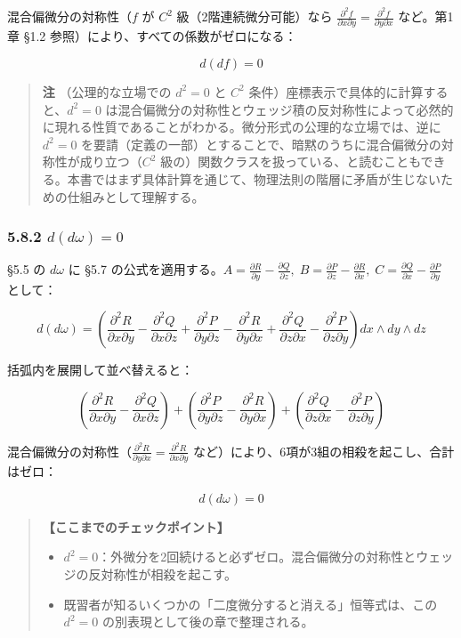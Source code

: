 \documentclass[a4paper,12pt,openany]{book}
\begin{document}
混合偏微分の対称性（\(f\) が \(C^2\) 級（2階連続微分可能）なら
\(\frac{\partial^2 f}{\partial x \partial y} = \frac{\partial^2 f}{\partial y \partial x}\)
など。第1章 §1.2 参照）により、すべての係数がゼロになる：

\[d(df) = 0\]

\begin{quote}
\textbf{注} （公理的な立場での \(d^2=0\) と \(C^2\)
条件）座標表示で具体的に計算すると、\(d^2=0\)
は混合偏微分の対称性とウェッジ積の反対称性によって必然的に現れる性質であることがわかる。微分形式の公理的な立場では、逆に
\(d^2=0\)
を要請（定義の一部）とすることで、暗黙のうちに混合偏微分の対称性が成り立つ（\(C^2\)
級の）関数クラスを扱っている、と読むこともできる。本書ではまず具体計算を通じて、物理法則の階層に矛盾が生じないための仕組みとして理解する。
\end{quote}

\hypertarget{ddomega-0}{%
\subsubsection{\texorpdfstring{5.8.2
\(d(d\omega) = 0\)}{5.8.2 d(d\textbackslash omega) = 0}}\label{ddomega-0}}

§5.5 の \(d\omega\) に §5.7
の公式を適用する。\(A = \frac{\partial R}{\partial y} - \frac{\partial Q}{\partial z},\; B = \frac{\partial P}{\partial z} - \frac{\partial R}{\partial x},\; C = \frac{\partial Q}{\partial x} - \frac{\partial P}{\partial y}\)
として：

\[d(d\omega) = \left(\frac{\partial^2 R}{\partial x \partial y} - \frac{\partial^2 Q}{\partial x \partial z} + \frac{\partial^2 P}{\partial y \partial z} - \frac{\partial^2 R}{\partial y \partial x} + \frac{\partial^2 Q}{\partial z \partial x} - \frac{\partial^2 P}{\partial z \partial y}\right) dx \wedge dy \wedge dz\]

括弧内を展開して並べ替えると：

\[\left(\frac{\partial^2 R}{\partial x \partial y} - \frac{\partial^2 Q}{\partial x \partial z}\right) + \left(\frac{\partial^2 P}{\partial y \partial z} - \frac{\partial^2 R}{\partial y \partial x}\right) + \left(\frac{\partial^2 Q}{\partial z \partial x} - \frac{\partial^2 P}{\partial z \partial y}\right)\]

混合偏微分の対称性（\(\frac{\partial^2 R}{\partial y \partial x}=\frac{\partial^2 R}{\partial x \partial y}\)
など）により、6項が3組の相殺を起こし、合計はゼロ：

\[d(d\omega) = 0\]

\begin{quote}
\textbf{【ここまでのチェックポイント】}

\begin{itemize}
\item
  \(d^2 = 0\)：外微分を2回続けると必ずゼロ。混合偏微分の対称性とウェッジの反対称性が相殺を起こす。
\item
  既習者が知るいくつかの「二度微分すると消える」恒等式は、この \(d^2=0\)
  の別表現として後の章で整理される。
\end{itemize}
\end{quote}
\end{document}
